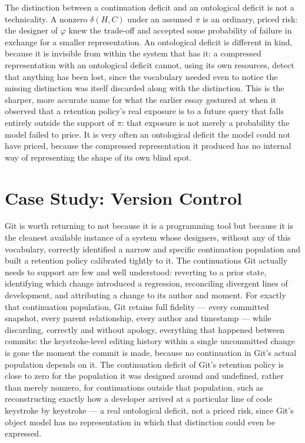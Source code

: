 \documentclass[11pt]{article}
\begin{document}
The distinction between a continuation deficit and an ontological deficit is not a technicality. A nonzero $\delta(H, C)$ under an assumed $\pi$ is an ordinary, priced risk: the designer of $\varphi$ knew the trade-off and accepted some probability of failure in exchange for a smaller representation. An ontological deficit is different in kind, because it is invisible from within the system that has it: a compressed representation with an ontological deficit cannot, using its own resources, detect that anything has been lost, since the vocabulary needed even to notice the missing distinction was itself discarded along with the distinction. This is the sharper, more accurate name for what the earlier essay gestured at when it observed that a retention policy's real exposure is to a future query that falls entirely outside the support of $\pi$: that exposure is not merely a probability the model failed to price. It is very often an ontological deficit the model could not have priced, because the compressed representation it produced has no internal way of representing the shape of its own blind spot.

\section{Case Study: Version Control}

Git is worth returning to not because it is a programming tool but because it is the cleanest available instance of a system whose designers, without any of this vocabulary, correctly identified a narrow and specific continuation population and built a retention policy calibrated tightly to it. The continuations Git actually needs to support are few and well understood: reverting to a prior state, identifying which change introduced a regression, reconciling divergent lines of development, and attributing a change to its author and moment. For exactly that continuation population, Git retains full fidelity --- every committed snapshot, every parent relationship, every author and timestamp --- while discarding, correctly and without apology, everything that happened between commits: the keystroke-level editing history within a single uncommitted change is gone the moment the commit is made, because no continuation in Git's actual population depends on it. The continuation deficit of Git's retention policy is close to zero for the population it was designed around and undefined, rather than merely nonzero, for continuations outside that population, such as reconstructing exactly how a developer arrived at a particular line of code keystroke by keystroke --- a real ontological deficit, not a priced risk, since Git's object model has no representation in which that distinction could even be expressed.
\end{document}
